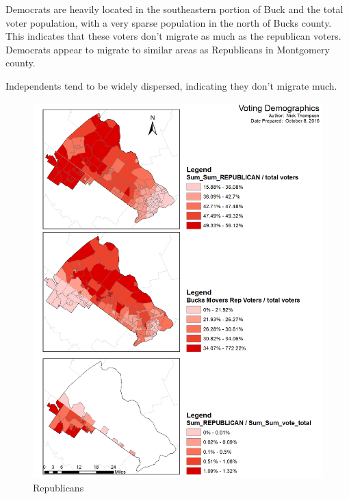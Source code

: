 \documentclass[12pt]{article}
\begin{document}
Democrats are heavily located in the southeastern portion of Buck and the total voter population, with a very sparse population in the north of Bucks county.  This indicates that these voters don't migrate as much as the republican voters. Democrats appear to migrate to similar areas as Republicans in Montgomery county. 

Independents tend to be widely dispersed, indicating they don't migrate much.

\begin{figure}[H]
	\caption{Republicans}
	\centerline{\includegraphics[scale=.75]{question_4a.png}} %
\end{figure}

\clearpage
\end{document}
